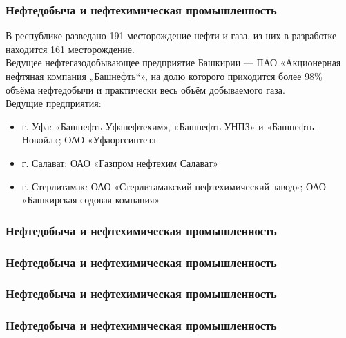 \begin{frame}
\frametitle{Нефтедобыча и нефтехимическая промышленность}

В республике разведано 191 месторождение нефти и газа, из них в разработке находится 161 месторождение.  \\[10pt]

Ведущее нефтегазодобывающее предприятие Башкирии — ПАО «Акционерная нефтяная компания „Башнефть“», на долю которого приходится более 98\% объёма нефтедобычи и практически весь объём добываемого газа. \\[10pt]

Ведущие предприятия:
\begin{itemize}
\item г. Уфа: «Башнефть-Уфанефтехим», «Башнефть-УНПЗ» и «Башнефть-Новойл»; ОАО «Уфаоргсинтез»
\item г. Салават: ОАО «Газпром нефтехим Салават»
\item г. Стерлитамак: ОАО «Стерлитамакский нефтехимический завод»; ОАО «Башкирская содовая компания»
\end{itemize}

\end{frame}

\begin{frame}
\frametitle{Нефтедобыча и нефтехимическая промышленность}


\end{frame}

\begin{frame}
\frametitle{Нефтедобыча и нефтехимическая промышленность}


\end{frame}

\begin{frame}
\frametitle{Нефтедобыча и нефтехимическая промышленность}


\end{frame}

\begin{frame}
\frametitle{Нефтедобыча и нефтехимическая промышленность}


\end{frame}

